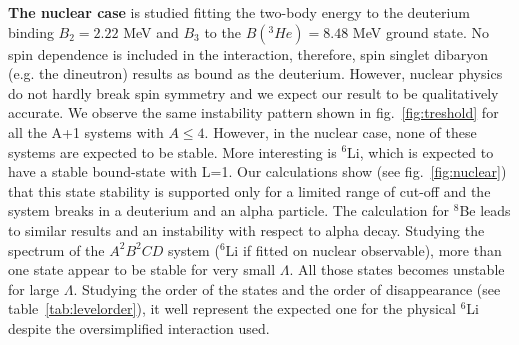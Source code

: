 \documentclass[preprint,12pt]{elsarticle}
\newcommand{\figref}[1]{fig.~\ref{#1}}
\newcommand{\tabref}[1]{table~\ref{#1}}
\begin{document}
\begin{figure}[h] 
\centering 
\begin{floatrow}

\end{floatrow}
\end{figure} 


\textbf{The nuclear case} is studied fitting the two-body energy to the deuterium binding $B_2=2.22$ MeV and $B_3$ to the $B(^3He)=8.48$ MeV ground state. 
No spin dependence is included in the interaction, therefore, spin singlet dibaryon (e.g. the dineutron) results as bound as the deuterium.
However, nuclear physics do not hardly break spin symmetry and we expect our result to be qualitatively accurate.
We observe the same instability pattern shown in \figref{fig:treshold} for all the A+1 systems with $A\le 4$.
However, in the nuclear case, none of these systems are expected to be stable. 
More interesting is $^6$Li, which is expected to have a stable bound-state with L=1.
Our calculations show (see \figref{fig:nuclear}) that this state stability is supported only for a limited range of cut-off and the system breaks in a deuterium and an alpha particle.
The calculation for $^8$Be leads to similar results and an instability with respect to alpha decay.
Studying the spectrum of the $A^2B^2CD$ system ($^6$Li if fitted on nuclear observable), more than one state appear to be stable for very small $\Lambda$.
All those states becomes unstable for large $\Lambda$. 
Studying the order of the states and the order of disappearance (see \tabref{tab:levelorder}), it well represent the expected one for the physical $^6$Li despite the oversimplified interaction used.
\end{document}
